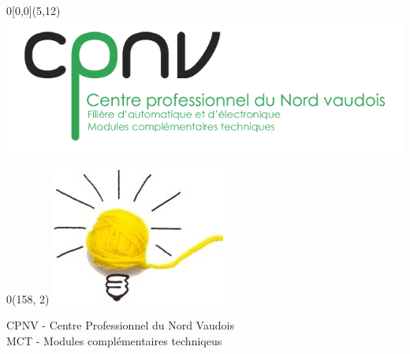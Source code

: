 \documentclass[
	a4paper,									%
	11pt,										%
	twoside,									%
	openright,									%
	notitlepage,									%
	parskip=half,								%
]{scrreprt}										%
\begin{document}
\begin{titlepage}
	\setlength{\unitlength}{1mm}

	\begin{textblock}{0}[0,0](5,12) %
		\includegraphics[scale=1]{img/logoCPNV.png}
	\end{textblock}

	\begin{textblock}{0}(158, 2)
		\includegraphics[scale=0.8]{img/logoMCT.jpg}
	\end{textblock}





	
	\flushleft
	\vspace*{1cm}
	\fontsize{18pt}{20pt}\selectfont
	CPNV - Centre Professionnel du Nord Vaudois \\
	\fontsize{12pt}{15pt}\selectfont\vspace{0.5em}
	MCT - Modules complémentaires techniqeus


\end{titlepage}
\end{document}
